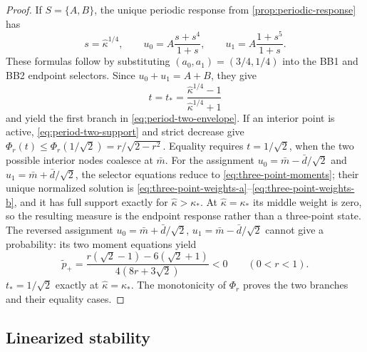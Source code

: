 \documentclass[letterpaper,twoside]{article}
\begin{document}
\begin{proof}
If $S=\{A,B\}$, the unique periodic response from
\cref{prop:periodic-response} has
\[
 s=\widehat\kappa^{1/4},\qquad
 u_0=A\frac{s+s^4}{1+s},\qquad
 u_1=A\frac{1+s^5}{1+s}.
\]
These formulas follow by substituting
$(a_0,a_1)=(3/4,1/4)$ into the BB1 and BB2 endpoint selectors.  Since
$u_0+u_1=A+B$, they give
\[
 t=t_*=
 \frac{\widehat\kappa^{1/4}-1}
      {\widehat\kappa^{1/4}+1}
\]
and yield the first branch in \eqref{eq:period-two-envelope}.  If an interior
point is active, \eqref{eq:period-two-support} and strict decrease give
$\Phi_r(t)\le\Phi_r(1/\sqrt2)=r/\sqrt{2-r^2}$.  Equality requires
$t=1/\sqrt2$, when the two possible interior nodes coalesce at $\bar m$.
For the assignment $u_0=\bar m-\bar d/\sqrt2$ and
$u_1=\bar m+\bar d/\sqrt2$, the selector equations reduce to
\eqref{eq:three-point-moments}; their unique normalized solution is
\eqref{eq:three-point-weights-a}--\eqref{eq:three-point-weights-b}, and it
has full support exactly for $\widehat\kappa>\kappa_*$.  At
$\widehat\kappa=\kappa_*$ its middle weight is zero, so the resulting
measure is the endpoint response rather than a three-point state.  The reversed
assignment $u_0=\bar m+\bar d/\sqrt2$,
$u_1=\bar m-\bar d/\sqrt2$ cannot give a probability: its two moment
equations yield
\[
 \widetilde p_+
 =\frac{r(\sqrt2-1)-6(\sqrt2+1)}
 {4(8r+3\sqrt2)}<0
 \qquad(0<r<1).
\]
$t_*=1/\sqrt2$ exactly at $\widehat\kappa=\kappa_*$.  The monotonicity of
$\Phi_r$ proves the two branches and their equality cases.
\end{proof}

\subsection{Linearized stability}
\end{document}
